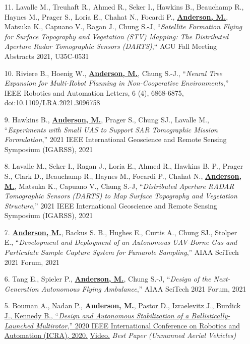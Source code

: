 \documentclass[12pt,letter,sans]{moderncv}        %
\begin{document}
\begin{itemize}
    \item [11.] Lavalle M., Treuhaft R., Ahmed R., Seker I., Hawkins B., Beauchamp R., Haynes M., Prager S., Loria E., Chahat N., Focardi P., \underline{\textbf{Anderson, M.}}, Matsuka K., Capuano V., Ragan J., Chung S.-J, ``\textit{Satellite Formation Flying for Surface Topography and Vegetation (STV) Mapping: The Distributed Aperture Radar Tomographic Sensors (DARTS)},`` AGU Fall Meeting Abstracts 2021, U35C-0531
    
    \item [10.] Riviere B., Hoenig W., \underline{\textbf{Anderson, M.}}, Chung S.-J., ``\textit{Neural Tree Expansion for Multi-Robot Planning in Non-Cooperative Environments},''  IEEE Robotics and Automation Letters, 6 (4), 6868-6875, doi:10.1109/LRA.2021.3096758
    
    \item [9.] Hawkins B., \underline{\textbf{Anderson, M.}}, Prager S., Chung SJ., Lavalle M., ``\textit{Experiments with Small UAS to Support SAR Tomographic Mission Formulation},'' 2021 IEEE International Geoscience and Remote Sensing Symposium (IGARSS), 2021
    
    \item [8.] Lavalle M., Seker I., Ragan J., Loria E., Ahmed R., Hawkins B. P., Prager S., Clark D., Beauchamp R., Haynes M., Focardi P., Chahat N., \underline{\textbf{Anderson, M.}}, Matsuka K., Capuano V., Chung S.-J, ``\textit{Distributed Aperture RADAR Tomographic Sensors (DARTS) to Map Surface Topography and Vegetation Structure},'' 2021 IEEE International Geoscience and Remote Sensing Symposium (IGARSS), 2021
    
    \item [7.] \underline{\textbf{Anderson, M.}}, Backus S. B., Hughes E., Curtis A., Chung SJ., Stolper E., ``\textit{Development and Deployment of an Autonomous UAV-Borne Gas and Particulate Sample Capture System for Fumarole Sampling},'' AIAA SciTech 2021 Forum, 2021

    \item [6.] Tang E., Spieler P., \underline{\textbf{Anderson, M.}}, Chung S.-J, ``\textit{Design of the Next-Generation Autonomous Flying Ambulance},'' AIAA SciTech 2021 Forum, 2021
    
    \item [5.] \href{https://arxiv.org/pdf/1911.10269}
    {Bouman A., Nadan P., \underline{\textbf{Anderson, M.}}, Pastor D., Izraelevitz J., Burdick J., Kennedy B., ``\textit{Design and Autonomous Stabilization of a Ballistically-Launched Multirotor},'' 2020 IEEE International Conference on Robotics and Automation (ICRA), 2020.}
    \href{https://www.youtube.com/watch?v=VVgcsRmd8F0}{Video.}
    \textit{Best Paper (Unmanned Aerial Vehicles)}
    

\end{itemize}
\end{document}
